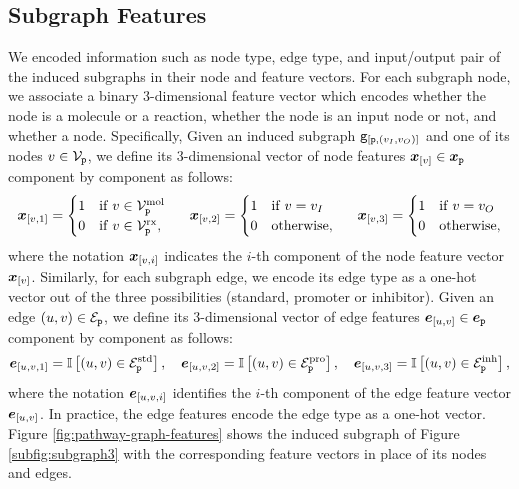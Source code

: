 \subsection{Subgraph Features}
We encoded information such as node type, edge type, and input/output pair of the induced subgraphs in their node and feature vectors. For each subgraph node, we associate a binary 3-dimensional feature vector which encodes whether the node is a molecule or a reaction, whether the node is an input node or not, and whether a node. Specifically, Given an induced subgraph $\mathtt{g}_{[\mathtt{p}, (v_I,v_O)]}$ and one of its nodes $v \in \Nodes{p}$, we define its 3-dimensional vector of node features $\Elem{x}{v} \in \Vector{x}_{\Graph{p}}$ component by component as follows:
\begin{align*}
    \Elem{x}{v, 1} = \begin{cases}
        1  & \mathrm{if}\; v \in \MolNodes{p}\\
        0  & \mathrm{if}\; v \in \RxNodes{p},
    \end{cases}
    \hspace{1.5em}
    \Elem{x}{v, 2} = \begin{cases}
        1  & \mathrm{if}\; v = v_I\\
        0  & \mathrm{otherwise},
    \end{cases}
    \hspace{1.5em}
    \Elem{x}{v, 3} = \begin{cases}
        1  & \mathrm{if}\; v = v_O\\
        0  & \mathrm{otherwise},
    \end{cases}
\end{align*}
where the notation $\Elem{x}{v, i}$ indicates the $i$-th component of the node feature vector $\Elem{x}{v}$.
Similarly, for each subgraph edge, we encode its edge type as a one-hot vector out of the three possibilities (standard, promoter or inhibitor). Given an edge $(u,v) \in \Edges{p}$, we define its 3-dimensional vector of edge features $\Elem{e}{u, v} \in \Vector{e}_{\Graph{p}}$ component by component as follows:
\begin{align*}
    \Elem{e}{u, v, 1} = \Indicator{(u,v) \in \StdEdges{p}}, \quad
    \Elem{e}{u, v, 2} = \Indicator{(u,v) \in \ProEdges{p}}, \quad
    \Elem{e}{u, v, 3} = \Indicator{(u,v) \in \InhEdges{p}},
\end{align*}
where the notation $\Elem{e}{u, v, i}$ identifies the $i$-th component of the edge feature vector $\Elem{e}{u, v}$. In practice, the edge features encode the edge type as a one-hot vector. Figure \ref{fig:pathway-graph-features} shows the induced subgraph of Figure \ref{subfig:subgraph3} with the corresponding feature vectors in place of its nodes and edges.
